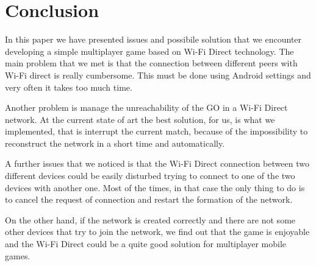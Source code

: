 \section{Conclusion}
In this paper we have presented issues and possibile solution that we 
encounter developing a simple multiplayer game based on Wi-Fi Direct 
technology. The main problem that we met is that the connection between 
different peers with Wi-Fi direct is really cumbersome. This must be done 
using Android settings and very often it takes too much time. 

Another problem is manage the unreachability of the GO in a Wi-Fi Direct
network. At the current state of art the best solution, for us, is what we 
implemented, that is interrupt the current match, because of the 
impossibility to reconstruct the network in a short time and automatically.

A further issues that we noticed is that the Wi-Fi Direct connection 
between two different devices could be easily disturbed trying to connect 
to one of the two devices with another one. Most of the times, in that case
the only thing to do is to cancel the request of connection and restart the 
formation of the network.

On the other hand, if the network is created correctly and there are not 
some other devices that try to join the network, we find out that the game 
is enjoyable and the Wi-Fi Direct could be a quite good solution for 
multiplayer mobile games.
